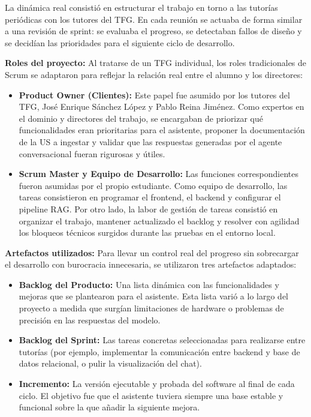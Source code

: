 \documentclass[12pt,a4paper,oneside]{report}
\begin{document}
La dinámica real consistió en estructurar el trabajo en torno a las tutorías periódicas con los tutores del TFG. En cada reunión se actuaba de forma similar a una revisión de sprint: se evaluaba el progreso, se detectaban fallos de diseño y se decidían las prioridades para el siguiente ciclo de desarrollo.

\textbf{Roles del proyecto:} Al tratarse de un TFG individual, los roles tradicionales de Scrum se adaptaron para reflejar la relación real entre el alumno y los directores:
\begin{itemize}
    \item \textbf{Product Owner (Clientes):} Este papel fue asumido por los tutores del TFG, José Enrique Sánchez López y Pablo Reina Jiménez. Como expertos en el dominio y directores del trabajo, se encargaban de priorizar qué funcionalidades eran prioritarias para el asistente, proponer la documentación de la US a ingestar y validar que las respuestas generadas por el agente conversacional fueran rigurosas y útiles.
    \item \textbf{Scrum Master y Equipo de Desarrollo:} Las funciones correspondientes fueron asumidas por el propio estudiante. Como equipo de desarrollo, las tareas consistieron en programar el frontend, el backend y configurar el pipeline RAG. Por otro lado, la labor de gestión de tareas consistió en organizar el trabajo, mantener actualizado el backlog y resolver con agilidad los bloqueos técnicos surgidos durante las pruebas en el entorno local.
\end{itemize}

\textbf{Artefactos utilizados:} Para llevar un control real del progreso sin sobrecargar el desarrollo con burocracia innecesaria, se utilizaron tres artefactos adaptados:
\begin{itemize}
    \item \textbf{Backlog del Producto:} Una lista dinámica con las funcionalidades y mejoras que se plantearon para el asistente. Esta lista varió a lo largo del proyecto a medida que surgían limitaciones de hardware o problemas de precisión en las respuestas del modelo.
    \item \textbf{Backlog del Sprint:} Las tareas concretas seleccionadas para realizarse entre tutorías (por ejemplo, implementar la comunicación entre backend y base de datos relacional, o pulir la visualización del chat).
    \item \textbf{Incremento:} La versión ejecutable y probada del software al final de cada ciclo. El objetivo fue que el asistente tuviera siempre una base estable y funcional sobre la que añadir la siguiente mejora.
\end{itemize}
\end{document}
